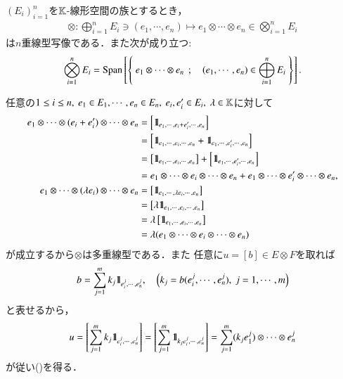 	\begin{screen}
		\begin{thm}[標準写像の多重線型性]\label{thm:tensor_product_is_bilinear}
			$(E_i)_{i=1}^n$を$\mathbb{K}$-線形空間の族とするとき，
			\begin{align}
				\otimes : \bigoplus_{i=1}^n E_i \ni (e_1,\cdots,e_n) \longmapsto e_1 \otimes \cdots \otimes e_n \in \bigotimes_{i=1}^n E_i
			\end{align}
			は$n$重線型写像である．また次が成り立つ:
			\begin{align}
				\bigotimes_{i=1}^n E_i = \mathrm{Span}\left[ \left\{\ e_1 \otimes \cdots \otimes e_n\ \, ; \quad (e_1,\cdots,e_n) \in \bigoplus_{i=1}^n E_i\ \right\} \right].
				\label{eq:thm_tensor_product_is_bilinear}
			\end{align}
		\end{thm}
	\end{screen}
	
	\begin{prf}
		任意の$1 \leq i \leq n,\ e_1 \in E_1,\cdots,e_n \in E_n,
		\ e_i,e_i' \in E_i,\ \lambda \in \mathbb{K}$に対して
		\begin{align}
			e_1 \otimes \cdots \otimes (e_i + e_i') \otimes \cdots \otimes e_n 
			&= \left[ \mbox{1}\hspace{-0.25em}\mbox{l}_{e_1,\cdots,e_i + e_i',\cdots,e_n} \right] \\
			&= \left[ \mbox{1}\hspace{-0.25em}\mbox{l}_{e_1,\cdots,e_i,\cdots,e_n} 
				+ \mbox{1}\hspace{-0.25em}\mbox{l}_{e_1,\cdots,e_i',\cdots,e_n} \right] \\
			&= \left[ \mbox{1}\hspace{-0.25em}\mbox{l}_{e_1,\cdots,e_i,\cdots,e_n} \right]
				+ \left[ \mbox{1}\hspace{-0.25em}\mbox{l}_{e_1,\cdots,e_i',\cdots,e_n} \right] \\
			&=e_1 \otimes \cdots \otimes e_i \otimes \cdots \otimes e_n 
			+ e_1 \otimes \cdots \otimes e_i' \otimes \cdots \otimes e_n, \\
			e_1 \otimes \cdots \otimes (\lambda e_i) \otimes \cdots \otimes e_n 
			&= \left[ \mbox{1}\hspace{-0.25em}\mbox{l}_{e_1,\cdots,\lambda e_i,\cdots,e_n} \right] \\
			&= \left[ \lambda \mbox{1}\hspace{-0.25em}\mbox{l}_{e_1,\cdots,e_i,\cdots,e_n} \right] \\
			&= \lambda \left[ \mbox{1}\hspace{-0.25em}\mbox{l}_{e_1,\cdots,e_i,\cdots,e_n} \right] \\
			&= \lambda (e_1 \otimes \cdots \otimes e_i \otimes \cdots \otimes e_n) 
		\end{align}
		が成立するから$\otimes$は多重線型である．また
		任意に$u = [b] \in E \otimes F$を取れば
		\begin{align}
			b = \sum_{j=1}^m k_j \mbox{1}\hspace{-0.25em}\mbox{l}_{e^j_i,\cdots,e^j_n},
			\quad \left( k_j = b(e^j_i,\cdots,e^j_n),\ j=1,\cdots,m \right)
		\end{align}
		と表せるから，
		\begin{align}
			u = \left[ \sum_{j=1}^m k_j \mbox{1}\hspace{-0.25em}\mbox{l}_{e^j_i,\cdots,e^j_n} \right]
			= \left[ \sum_{j=1}^m \mbox{1}\hspace{-0.25em}\mbox{l}_{k_j e^j_i,\cdots,e^j_n} \right]
			= \sum_{j=1}^m (k_j e^j_1) \otimes \cdots \otimes e^j_n
		\end{align}
		が従い()を得る．
		\QED
	\end{prf}
	
